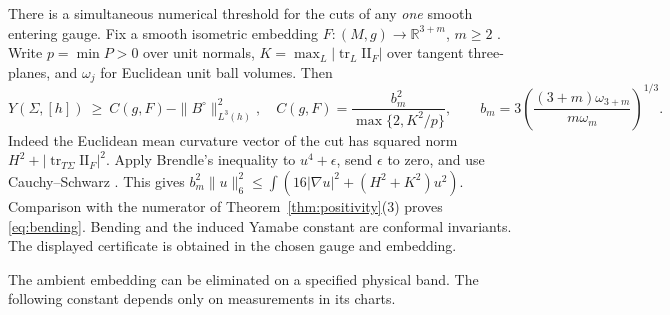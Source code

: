 \documentclass[11pt,letterpaper]{article}
\numberwithin{equation}{section}
\theoremstyle{definition}
\DeclareMathOperator{\tr}{tr}
\begin{document}
There is a simultaneous numerical threshold for the cuts of any
\emph{one} smooth entering gauge. Fix a smooth isometric embedding
\(F:(M,g)\longrightarrow\mathbb R^{3+m}\), \(m\ge2\)
\cite[Part C, Theorem 2]{Nash1956Embedding}. Write \(p=\min P>0\) over
unit normals, \(K=\max_L|\tr_L\mathrm{II}_F|\) over tangent three-planes,
and \(\omega_j\) for Euclidean unit ball volumes. Then
\begin{equation}\label{eq:bending}
 Y(\Sigma,[h])\ \ge\ C(g,F)-\|B^\circ\|_{L^3(h)}^2,\quad
 C(g,F)=\frac{b_m^2}{\max\{2,K^2/p\}},\qquad
 b_m=3\left(\frac{(3+m)\omega_{3+m}}{m\omega_m}\right)^{1/3}.
\end{equation}
Indeed the Euclidean mean curvature vector of the cut has squared norm
\(H^2+|\tr_{T\Sigma}\mathrm{II}_F|^2\). Apply Brendle's inequality to
\(u^4+\epsilon\), send \(\epsilon\) to zero, and use Cauchy--Schwarz
\cite[Theorem 1]{Brendle2021Isoperimetric}. This gives
\(b_m^2\|u\|_6^2\le\int(16|\nabla u|^2+(H^2+K^2)u^2)\).
Comparison with the numerator of Theorem~\ref{thm:positivity}(3)
proves \eqref{eq:bending}. Bending and the induced Yamabe constant
are conformal invariants. The displayed certificate is obtained in the
chosen gauge and embedding.

The ambient embedding can be eliminated on a specified physical band.
The following constant depends only on measurements in its charts.
\end{document}
